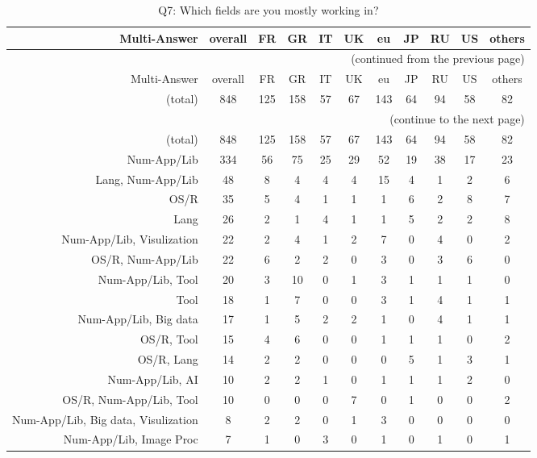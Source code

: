 \clearpage%
{\footnotesize\begin{landscape}%
\begin{longtable}[htb]{r|c|c|c|c|c|c|c|c|c|c}%
\caption{Q7: Which fields are you mostly working in?}%
\label{tab:Q7-mans} \\%
\hline%
Multi-Answer & overall & FR & GR & IT & UK & eu & JP & RU & US & others \\
 \hline%
\endfirsthead%
\multicolumn{11}{r}{(continued from the previous page)}\\%
\hline%
Multi-Answer & overall & FR & GR & IT & UK & eu & JP & RU & US & others \\
 \hline%
\endhead%
\hline%
(total) & 848 & 125 & 158 & 57 & 67 & 143 & 64 & 94 & 58 & 82 \\%
\hline%
\multicolumn{11}{r}{(continue to the next page)}\\%
\endfoot%
\hline%
(total) & 848 & 125 & 158 & 57 & 67 & 143 & 64 & 94 & 58 & 82 \\%
\hline%
\endlastfoot%
\hline%
{Num-App/Lib} & 334 & 56 & 75 & 25 & 29 & 52 & 19 & 38 & 17 & 23 \\%
{Lang, Num-App/Lib} & 48 & 8 & 4 & 4 & 4 & 15 & 4 & 1 & 2 & 6 \\%
{OS/R} & 35 & 5 & 4 & 1 & 1 & 1 & 6 & 2 & 8 & 7 \\%
{Lang} & 26 & 2 & 1 & 4 & 1 & 1 & 5 & 2 & 2 & 8 \\%
{Num-App/Lib, Visulization} & 22 & 2 & 4 & 1 & 2 & 7 & 0 & 4 & 0 & 2 \\%
{OS/R, Num-App/Lib} & 22 & 6 & 2 & 2 & 0 & 3 & 0 & 3 & 6 & 0 \\%
{Num-App/Lib, Tool} & 20 & 3 & 10 & 0 & 1 & 3 & 1 & 1 & 1 & 0 \\%
{Tool} & 18 & 1 & 7 & 0 & 0 & 3 & 1 & 4 & 1 & 1 \\%
{Num-App/Lib, Big data} & 17 & 1 & 5 & 2 & 2 & 1 & 0 & 4 & 1 & 1 \\%
{OS/R, Tool} & 15 & 4 & 6 & 0 & 0 & 1 & 1 & 1 & 0 & 2 \\%
{OS/R, Lang} & 14 & 2 & 2 & 0 & 0 & 0 & 5 & 1 & 3 & 1 \\%
{Num-App/Lib, AI} & 10 & 2 & 2 & 1 & 0 & 1 & 1 & 1 & 2 & 0 \\%
{OS/R, Num-App/Lib, Tool} & 10 & 0 & 0 & 0 & 7 & 0 & 1 & 0 & 0 & 2 \\%
{Num-App/Lib, Big data, Visulization} & 8 & 2 & 2 & 0 & 1 & 3 & 0 & 0 & 0 & 0 \\%
{Num-App/Lib, Image Proc} & 7 & 1 & 0 & 3 & 0 & 1 & 0 & 1 & 0 & 1 \\%

\end{longtable}
\end{landscape}}
